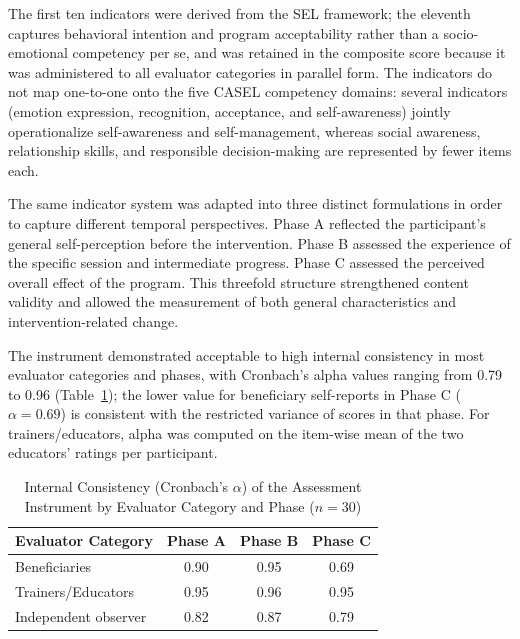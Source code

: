 \documentclass[12pt,a4paper]{article}
\begin{document}
The first ten indicators were derived from the SEL framework; the eleventh captures behavioral intention and program acceptability rather than a socio-emotional competency per se, and was retained in the composite score because it was administered to all evaluator categories in parallel form. The indicators do not map one-to-one onto the five CASEL competency domains: several indicators (emotion expression, recognition, acceptance, and self-awareness) jointly operationalize self-awareness and self-management, whereas social awareness, relationship skills, and responsible decision-making are represented by fewer items each.

The same indicator system was adapted into three distinct formulations in order to capture different temporal perspectives. Phase A reflected the participant's general self-perception before the intervention. Phase B assessed the experience of the specific session and intermediate progress. Phase C assessed the perceived overall effect of the program. This threefold structure strengthened content validity and allowed the measurement of both general characteristics and intervention-related change.

The instrument demonstrated acceptable to high internal consistency in most evaluator categories and phases, with Cronbach's alpha values ranging from 0.79 to 0.96 (Table~\ref{tab:cronbach}); the lower value for beneficiary self-reports in Phase C ($\alpha = 0.69$) is consistent with the restricted variance of scores in that phase. For trainers/educators, alpha was computed on the item-wise mean of the two educators' ratings per participant.

\begin{table}[!t]
\caption{Internal Consistency (Cronbach's $\alpha$) of the Assessment Instrument by Evaluator Category and Phase ($n = 30$)}
\label{tab:cronbach}
\centering
\begin{tabular}{lccc}
\hline
\textbf{Evaluator Category} & \textbf{Phase A} & \textbf{Phase B} & \textbf{Phase C} \\
\hline
Beneficiaries & 0.90 & 0.95 & 0.69 \\
Trainers/Educators & 0.95 & 0.96 & 0.95 \\
Independent observer & 0.82 & 0.87 & 0.79 \\
\hline
\end{tabular}
\end{table}
\end{document}

